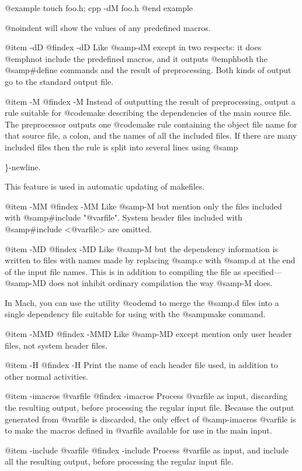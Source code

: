 {{{{@example
touch foo.h; cpp -dM foo.h
@end example

@noindent 
will show the values of any predefined macros.

@item -dD
@findex -dD
Like @samp{-dM} except in two respects: it does @emph{not} include the
predefined macros, and it outputs @emph{both} the @samp{#define}
commands and the result of preprocessing.  Both kinds of output go to
the standard output file.

@item -M
@findex -M
Instead of outputting the result of preprocessing, output a rule
suitable for @code{make} describing the dependencies of the main
source file.  The preprocessor outputs one @code{make} rule containing
the object file name for that source file, a colon, and the names of
all the included files.  If there are many included files then the
rule is split into several lines using @samp{\}-newline.

This feature is used in automatic updating of makefiles.

@item -MM
@findex -MM
Like @samp{-M} but mention only the files included with @samp{#include
"@var{file}"}.  System header files included with @samp{#include
<@var{file}>} are omitted.

@item -MD
@findex -MD
Like @samp{-M} but the dependency information is written to files with
names made by replacing @samp{.c} with @samp{.d} at the end of the
input file names.  This is in addition to compiling the file as
specified---@samp{-MD} does not inhibit ordinary compilation the way
@samp{-M} does.

In Mach, you can use the utility @code{md} to merge the @samp{.d} files
into a single dependency file suitable for using with the @samp{make}
command.

@item -MMD
@findex -MMD
Like @samp{-MD} except mention only user header files, not system
header files.

@item -H
@findex -H
Print the name of each header file used, in addition to other normal
activities.

@item -imacros @var{file}
@findex -imacros
Process @var{file} as input, discarding the resulting output, before
processing the regular input file.  Because the output generated from
@var{file} is discarded, the only effect of @samp{-imacros @var{file}}
is to make the macros defined in @var{file} available for use in the
main input.

@item -include @var{file}
@findex -include
Process @var{file} as input, and include all the resulting output,
before processing the regular input file.  

}}}}}
